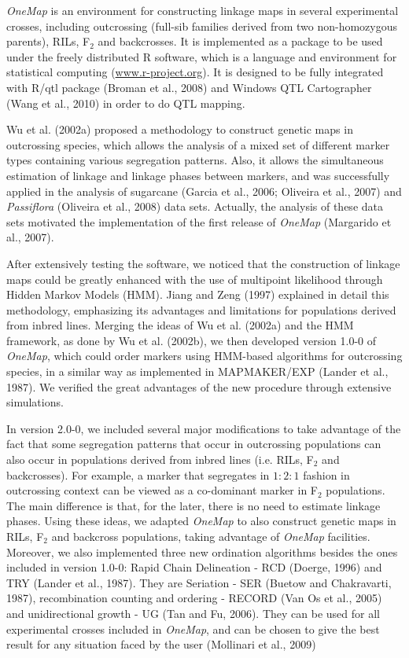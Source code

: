 \documentclass[letterpaper,12pt,oneside]{article}
\begin{document}
{\sl OneMap} is an environment for constructing linkage maps in several experimental crosses, including outcrossing (full-sib families derived from two non-homozygous parents), RILs, F$_2$ and backcrosses. It is implemented as a package to be used under the freely distributed R software, which is a language and environment for statistical computing (\url{www.r-project.org}). It is designed to be fully integrated with R/qtl package (Broman et al., 2008) and Windows QTL Cartographer (Wang et al., 2010) in order to do QTL mapping.

Wu et al. (2002a) proposed a methodology to construct genetic maps in outcrossing species, which allows the analysis of a mixed set of different marker types containing various segregation patterns. Also, it allows the simultaneous estimation of linkage and linkage phases between markers, and was successfully applied in the analysis of sugarcane (Garcia et al., 2006; Oliveira et al., 2007) and {\it Passiflora} (Oliveira et al., 2008) data sets. Actually, the analysis of these data sets motivated the implementation of the first release of {\sl OneMap} (Margarido et al., 2007). 

After extensively testing the software, we noticed that the construction of linkage maps could be greatly enhanced with the use of multipoint likelihood through Hidden Markov Models (HMM). Jiang and Zeng (1997) explained in detail this methodology, emphasizing its advantages and limitations for populations derived from inbred lines. Merging the ideas of Wu et al. (2002a) and the HMM framework, as done by Wu et al. (2002b), we then developed version 1.0-0 of {\sl OneMap}, which could order markers using HMM-based algorithms for outcrossing species, in a similar way as implemented in MAPMAKER/EXP (Lander et al., 1987). We verified the great advantages of the new procedure through extensive simulations.

In version 2.0-0, we included several major modifications to take advantage of the fact that some segregation patterns that occur in outcrossing populations can also occur in populations derived from inbred lines (i.e. RILs, F$_2$ and backcrosses). For example, a marker that segregates in $1:2:1$ fashion in outcrossing context can be viewed as a co-dominant marker in F$_2$ populations. The main difference is that, for the later, there is no need to estimate linkage phases. Using these ideas, we adapted {\sl OneMap} to also construct genetic maps in RILs, F$_2$ and backcross populations, taking advantage of {\sl OneMap} facilities. Moreover, we also implemented three new ordination algorithms besides the ones included in version 1.0-0: Rapid Chain Delineation - RCD (Doerge, 1996) and TRY (Lander et al., 1987). They are Seriation - SER (Buetow and Chakravarti, 1987), recombination counting and ordering - RECORD (Van Os et al., 2005) and unidirectional growth - UG (Tan and Fu, 2006). They can be used for all experimental crosses included in {\sl OneMap}, and can be chosen to give the best result for any situation faced by the user (Mollinari et al., 2009) 
\end{document}

